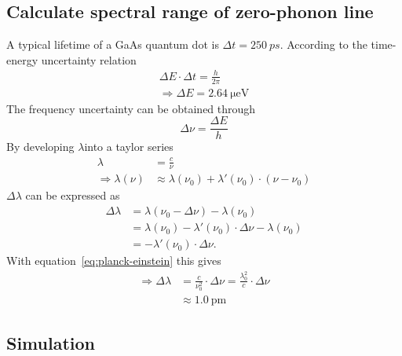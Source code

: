 \subsection{Calculate spectral range of zero-phonon line}
A typical lifetime of a GaAs quantum dot is $\Delta t = 250~ps$.
According to the time-energy uncertainty relation
\begin{align}
\Delta E \cdot \Delta t = \frac{h}{2 \pi}\\
\Rightarrow \Delta E = \SI{2.64}{\micro \electronvolt}
\end{align}
The frequency uncertainty can be obtained through
\begin{equation}
\Delta \nu = \frac{\Delta E}{h}
\end{equation}
By developing $\lambda$into a taylor series
\begin{align}
\label{eq:planck-einstein}
\lambda &= \frac{c}{\nu}\\
\Rightarrow \lambda(\nu) &\approx \lambda(\nu_0) + \lambda'(\nu_0) \cdot (\nu - \nu_0)
\end{align}
$\Delta \lambda$ can be expressed as
\begin{align}
\Delta \lambda &= \lambda(\nu_0 - \Delta \nu) - \lambda(\nu_0)\\
 &= \lambda(\nu_0) - \lambda'(\nu_0)\cdot\Delta \nu - \lambda(\nu_0)\\
 &= - \lambda'(\nu_0)\cdot \Delta \nu.
\end{align}
With equation~\eqref{eq:planck-einstein} this gives
\begin{align}
\Rightarrow \Delta \lambda &= \frac{c}{\nu_0^2} \cdot \Delta \nu = \frac{\lambda_0^2}{c}\cdot\Delta \nu\\
\label{eq:zero-phonon-theoretical-limit}
&\approx \SI{1.0}{\pico \metre}
\end{align}

\subsection{Simulation}

